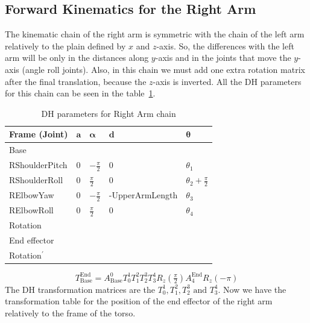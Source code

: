 \subsection{Forward Kinematics for the Right Arm}
The kinematic chain of the right arm is symmetric with the chain of the left arm relatively to the plain defined by $x$ and $z$-axis. So, the differences with the left arm will be only in the distances along $y$-axis and in the joints that move the $y$-axis (angle roll joints). Also, in this chain we must add one extra rotation matrix after the final translation, because the $z$-axis is inverted. All the DH parameters for this chain can be seen in the table~\ref{tab:DHrarm}. 
\begin{table}[!h]
\centering
\caption{DH parameters for Right Arm chain}
\begin{tabular}{|l|>{\centering\arraybackslash}m{2.55cm}|>{\centering\arraybackslash}m{2.55cm}|>{\centering\arraybackslash}m{2.55cm}|>{\centering\arraybackslash}m{2.55cm}|}
\hline
\textbf{Frame (Joint)} & $\mathbf{a}$ & $\boldsymbol{\alpha}$ & $\mathbf{d}$ & $\boldsymbol{\theta}$\\ \hline
Base & \multicolumn{4}{|c|}{$A(0,\text{\footnotesize{-ShoulderOffsetY - ElbowOffsetY}},\text{\footnotesize{ShoulderOffsetZ}})$} \\ \hline
RShoulderPitch & $0$ & $-\frac{\pi}{2}$ & $0$ & $\theta_1$ \\ \hline
RShoulderRoll & $0$ & $\frac{\pi}{2}$ & $0$ & $\theta_2 + \frac{\pi}{2}$ \\ \hline
RElbowYaw & $0$ & $-\frac{\pi}{2}$ & \footnotesize{-UpperArmLength} & $\theta_3$ \\ \hline
RElbowRoll & $0$ & $\frac{\pi}{2}$ & $0$ & $\theta_4$ \\ \hline
Rotation & \multicolumn{4}{c|}{$R_z(\frac{\pi}{2})$} \\ \hline
End effector & \multicolumn{4}{c|}{$A(\text{\footnotesize{-HandOffsetX-LowerArmLength}},0,0)$} \\ \hline
Rotation$^{'}$ & \multicolumn{4}{c|}{$R_z(-\pi)$} \\ \hline
\end{tabular}
\label{tab:DHrarm}
\end{table}
\[
T^\text{End}_\text{Base} = A^0_\text{Base}T^1_0T^2_1T^3_2T^4_3R_z(\tfrac{\pi}{2})A^\text{End}_{4}R_z(-\pi)
\]
The DH transformation matrices are the $T^1_0,T^2_1,T^3_2\text{ and }T^4_3$. Now we have the transformation table for the position of the end effector of the right arm relatively to the frame of the torso.

